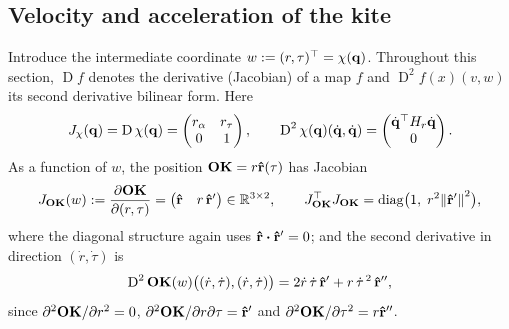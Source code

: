 \documentclass[10pt, a4paper]{article}
\begin{document}
\subsection{Velocity and acceleration of the kite}

Introduce the intermediate coordinate $w := (r, \tau)^\top = \chi(\vb q)$.
Throughout this section, $\operatorname{D}f$ denotes the derivative
(Jacobian) of a map $f$ and $\operatorname{D}^2f(x)(v, w)$ its second
derivative bilinear form.  Here
\begin{equation} \label{eq:chi}
    J_\chi(\vb q) = \operatorname{D}\chi(\vb q)
    = \begin{pmatrix} r_\alpha & r_\tau \\ 0 & 1 \end{pmatrix},
    \qquad
    \operatorname{D}^2\chi(\vb q)(\dot{\vb q}, \dot{\vb q})
    = \begin{pmatrix} \dot{\vb q}^\top H_r \dot{\vb q} \\ 0 \end{pmatrix}.
\end{equation}
As a function of $w$, the position $\vb{OK} = r\vu r(\tau)$ has Jacobian
\begin{equation} \label{eq:J-OK}
    J_{\vb{OK}}(w)
    := \frac{\partial \vb{OK}}{\partial (r, \tau)}
    = \begin{pmatrix} \vu r & r\,\vu r' \end{pmatrix}
    \in \mathbb{R}^{3\times 2},
    \qquad
    J_{\vb{OK}}^\top J_{\vb{OK}}
    = \operatorname{diag}\bigl(1,\; r^2\norm{\vu r'}^2\bigr),
\end{equation}
where the diagonal structure again uses $\rhat \vdot \rhat' = 0$; and the
second derivative in direction $(\dot r, \dot\tau)$ is
\begin{equation} \label{eq:D2-OK}
    \operatorname{D}^2\vb{OK}(w)\bigl((\dot r, \dot\tau), (\dot r, \dot\tau)\bigr)
    = 2\dot r\,\dot\tau\,\vu r' + r\,\dot\tau^{\,2}\,\vu r'',
\end{equation}
since $\partial^2\vb{OK}/\partial r^2 = 0$,
$\partial^2\vb{OK}/\partial r\partial\tau = \vu r'$ and
$\partial^2\vb{OK}/\partial\tau^2 = r\vu r''$.
\end{document}
